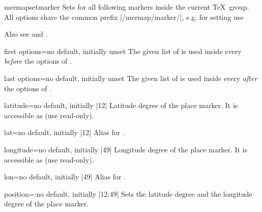 \begin{docCommand}{mermapsetmarker}{}
  Sets  for all following markers inside the current \TeX\ group.
  All options share the common prefix |/mermap/marker/|, e.g. for setting
   use
  \begin{dispListing}
  \end{dispListing}
  Also see  and .
\end{docCommand}

\pagebreak

\begin{docMrcKey}[marker]{first options}{=}{no default, initially unset}
  The given list of  is used inside every 
  \emph{before} the options of .
\end{docMrcKey}

\begin{docMrcKey}[marker]{last options}{=}{no default, initially unset}
  The given list of  is used inside every 
  \emph{after} the options of .
\end{docMrcKey}

\begin{docMrcKey}[marker]{latitude}{=}{no default, initially |12|}
  Latitude degree of the place marker.
  It is accessible as  (use read-only).
\end{docMrcKey}

\begin{docMrcKey}[marker]{lat}{=}{no default, initially |12|}
  Alias for .
\end{docMrcKey}

\begin{docMrcKey}[marker]{longitude}{=}{no default, initially |49|}
  Longitude degree of the place marker.
  It is accessible as  (use read-only).
\end{docMrcKey}

\begin{docMrcKey}[marker]{lon}{=}{no default, initially |49|}
  Alias for .
\end{docMrcKey}

\begin{docMrcKey}[marker]{position}{=:}{no default, initially |12:49|}
  Sets the latitude degree and the longitude degree of the place marker.
\end{docMrcKey}

